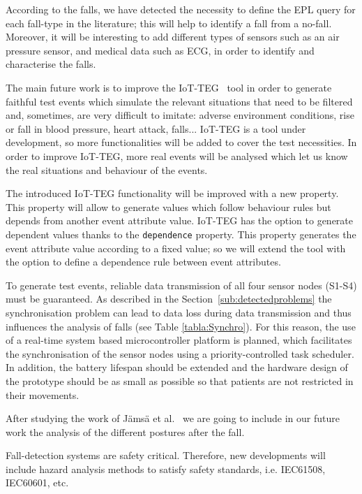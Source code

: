 \documentclass[journal]{IEEEtran}
\begin{document}
According to the falls, we have detected the necessity to define the
EPL query for each fall-type in the literature; this will
help to identify a fall from a no-fall. Moreover, it will be
interesting to add different types of sensors such as an air 
pressure sensor, and medical data such as ECG, in order to identify and characterise the falls.

The main future work is to improve the IoT-TEG~\cite{TesisGutierrez2017,Gutierrez2017} tool in order to generate faithful 
test events which simulate the 
relevant situations that need to be filtered and, sometimes, are very difficult to imitate: adverse environment conditions, 
rise or fall in blood pressure, heart attack, falls... IoT-TEG is a
tool under development, so more functionalities will be added
to cover the test necessities. In order to improve IoT-TEG, more real events will be analysed which let us know 
the real situations and behaviour of the events.

The introduced IoT-TEG functionality will be improved with a new property. This property will allow to generate values 
which follow behaviour rules but depends from another event attribute value. IoT-TEG has the option
to generate dependent values thanks to the \texttt{\small{dependence}} property. This property generates the event attribute value 
according to a fixed value; so we will extend the tool with the option to define a dependence rule between event attributes. 

To generate test events, reliable data transmission of all four sensor nodes (S1-S4) must be guaranteed. As described in 
the Section~\ref{sub:detectedproblems} the synchronisation problem can
lead to data loss during data transmission and  
thus influences the analysis of falls (see Table
\ref{tabla:Synchro}). For this reason, the use of a real-time system  
based microcontroller platform is planned, which facilitates the
synchronisation of the sensor nodes using a  
priority-controlled task scheduler. In addition, the battery lifespan
should be extended and the hardware design of the  
prototype should be as small as possible so that patients are not
restricted in their movements.

After studying the work of J{\"a}ms{\"a} et al.~\cite{jamsa2014fall}
we are going to include in our future work the analysis of 
the different postures after the fall. 

Fall-detection systems are safety critical. Therefore, new developments will include hazard analysis methods
to satisfy safety standards, i.e. IEC61508, IEC60601, etc.
\end{document}
